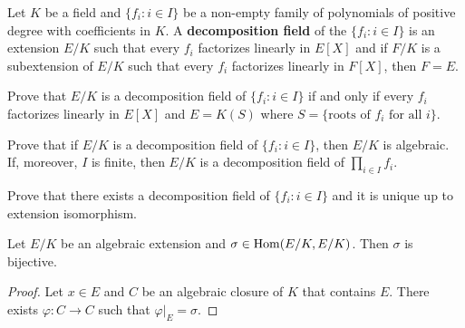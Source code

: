 

\begin{definition}
    Let $K$ be a field and $\{f_i:i\in I\}$ be a non-empty 
    family of polynomials of positive degree
    with coefficients in $K$. A \textbf{decomposition field} 
    of the $\{f_i:i\in I\}$ is an extension $E/K$
    such that every $f_i$ factorizes linearly in $E[X]$ and 
    if $F/K$ is a subextension of $E/K$ such that every $f_i$ 
    factorizes linearly in $F[X]$, then $F=E$. 
\end{definition}

\begin{exercise}
    Prove that $E/K$ is a decomposition field of
    $\{f_i:i\in I\}$ if and only if every $f_i$ factorizes linearly 
    in $E[X]$ and $E=K(S)$ where $S=\{\text{roots of $f_i$ for all $i$}\}$. 
\end{exercise}

\begin{exercise}
    Prove that if $E/K$ is a decomposition field
    of $\{f_i:i\in I\}$, then $E/K$ is algebraic. If, moreover, 
    $I$ is finite, then $E/K$ is a decomposition field
    of $\prod_{i\in I}f_i$. 
\end{exercise}

\begin{exercise}
    Prove that 
    there exists a decomposition field of $\{f_i:i\in I\}$ 
    and it is unique up to extension isomorphism. 
\end{exercise}


\begin{proposition}
    Let $E/K$ be an algebraic extension and $\sigma\in\operatorname{Hom}(E/K,E/K)$. 
    Then $\sigma$ is bijective. 
\end{proposition}

\begin{proof}
    Let $x\in E$ and 
    $C$ be an algebraic closure of $K$ that contains $E$. There
    exists $\varphi\colon C\to C$ such that $\varphi|_E=\sigma$. 
\end{proof}